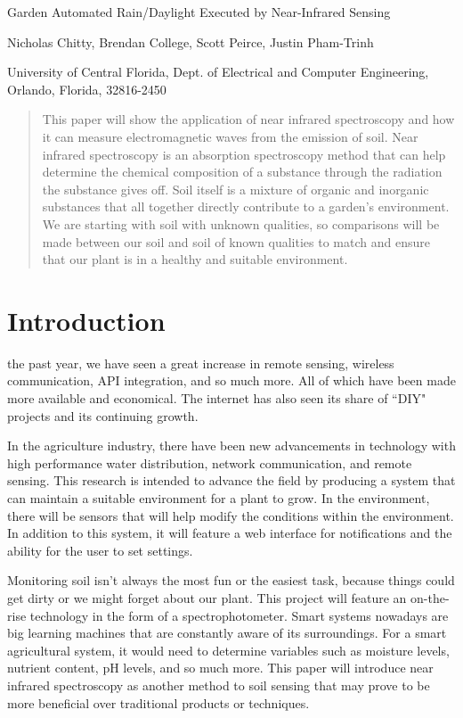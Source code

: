 \documentclass[journal]{IEEEtran}
\begin{document}
\begin{center}
   \Large Garden Automated Rain/Daylight Executed by Near-Infrared Sensing \break

   \large Nicholas Chitty, Brendan College, Scott Peirce, Justin Pham-Trinh \break

   \large University of Central Florida, Dept. of Electrical and Computer Engineering, Orlando,
   Florida, 32816-2450
\end{center}

\begin{abstract}
   This paper will show the application of near infrared spectroscopy 
and how it can measure electromagnetic waves from the emission of soil. Near infrared spectroscopy 
is an absorption spectroscopy method that can help determine the chemical composition of a 
substance through the radiation the substance gives off. Soil itself is a mixture of organic and 
inorganic substances that all together directly contribute to a garden’s environment. We are 
starting with soil with unknown qualities, so comparisons will be made between our soil and soil 
of known qualities to match and ensure that our plant is in a healthy and suitable environment. 
\end{abstract}

\section{Introduction}
 the past year, we have seen a great increase in remote sensing, wireless 
communication, API integration, and so much more. All of which have been made more available and 
economical. The internet has also seen its share of ``DIY" projects and its continuing growth.

In the agriculture industry, there have been new advancements in technology with high performance 
water distribution, network communication, and remote sensing. This research is intended to advance
the field by producing a system that can maintain a suitable environment for a plant to grow. In the 
environment, there will be sensors that will help modify the conditions within the environment. In 
addition to this system, it will feature a web interface for notifications and the ability for the 
user to set settings.

Monitoring soil isn't always the most fun or the easiest task, because things could get dirty or we 
might forget about our plant. This project will feature an on-the-rise technology in the form of a 
spectrophotometer. Smart systems nowadays are big learning machines that are constantly aware of its 
surroundings. For a smart agricultural system, it would need to determine variables such as moisture 
levels, nutrient content, pH levels, and so much more. This paper will introduce near infrared 
spectroscopy as another method to soil sensing that may prove to be more beneficial over traditional 
products or techniques.
\end{document}
